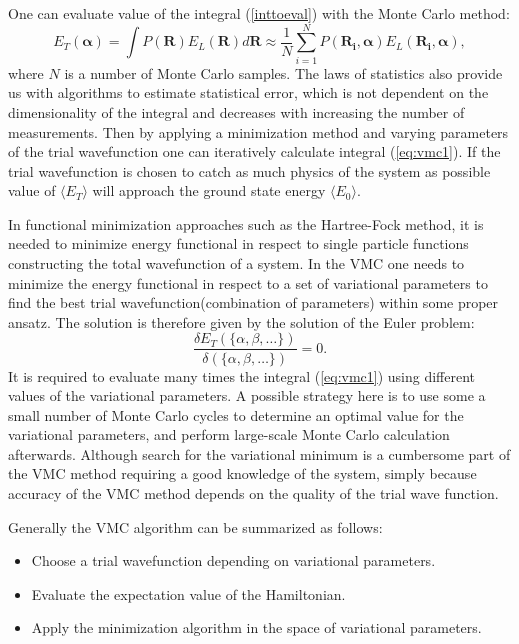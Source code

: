 \documentclass[twoside,english]{uiofysmaster}
\begin{document}
One can evaluate value of the integral (\ref{inttoeval}) with the Monte Carlo method: 
\begin{equation}\label{eq:vmc1}
E_T(\boldsymbol{\alpha})=\int P(\boldsymbol{R})E_L(\boldsymbol{R}) d\boldsymbol{R}\approx \frac{1}{N}\sum_{i=1}^NP(\boldsymbol{R_i},\boldsymbol{\alpha})E_L(\boldsymbol{R_i},\boldsymbol{\alpha}),
\end{equation}
where $N$ is a number of Monte Carlo samples. The laws of statistics also provide us with algorithms to estimate statistical error, which is not dependent on the dimensionality of the integral and decreases with increasing the number of measurements.
Then by applying a minimization method and varying parameters of the trial wavefunction one can iteratively calculate integral (\ref{eq:vmc1}). If the trial wavefunction is chosen to catch as much physics of the system as possible value of $\langle E_T \rangle$ will approach the ground state energy $\langle E_0 \rangle$.

In functional minimization approaches such as the Hartree-Fock method, it is needed to minimize energy functional in respect to single particle functions constructing the total wavefunction of a system. In the VMC one needs to minimize the energy functional in respect to a set of variational parameters to find the best trial wavefunction(combination of parameters) within some proper ansatz. The solution is therefore given by the solution of the Euler problem:
\begin{equation}
\frac{\delta E_T(\{\alpha, \beta, \dots\})}{\delta(\{\alpha, \beta, \dots\})} = 0.
\end{equation}
It is required to evaluate many times the integral (\ref{eq:vmc1}) using different values of the variational parameters. A possible strategy here is to use some a small number of Monte Carlo cycles to determine an optimal value for the variational parameters, and perform large-scale Monte Carlo calculation afterwards. Although search for the variational minimum is a cumbersome part of the VMC method requiring a good knowledge of the system, simply because accuracy of the VMC method depends on the quality of the trial wave function.

Generally the VMC algorithm can be summarized as follows:

\begin{itemize}
	\item Choose a trial wavefunction depending on variational parameters.
	\item Evaluate the expectation value of the Hamiltonian.
	\item Apply the minimization algorithm in the space of variational parameters.
\end{itemize} 
\end{document}
